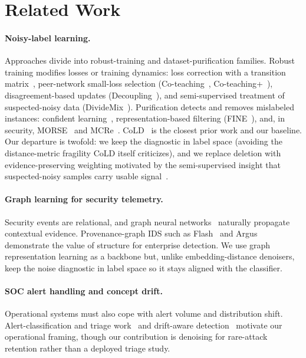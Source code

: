 \documentclass[preprint,3p,times]{elsarticle}
\begin{document}
\section{Related Work}
\label{sec:related}
\paragraph{Noisy-label learning.}
Approaches divide into robust-training and dataset-purification families. Robust
training modifies losses or training dynamics: loss correction with a transition
matrix~\cite{patrini2017making}, peer-network small-loss selection
(Co-teaching~\cite{han2018coteaching}, Co-teaching+~\cite{yu2019coteachingplus}),
disagreement-based updates (Decoupling~\cite{malach2017decoupling}), and
semi-supervised treatment of suspected-noisy data
(DivideMix~\cite{li2020dividemix}). Purification detects and removes mislabeled
instances: confident learning~\cite{northcutt2021confident}, representation-based
filtering (FINE~\cite{kim2021fine}), and, in security, MORSE~\cite{wu2023morse}
and MCRe~\cite{yuan2023mcre}. CoLD~\cite{yang2026cold} is the closest prior work
and our baseline. Our departure is twofold: we keep the diagnostic in label space
(avoiding the distance-metric fragility CoLD itself criticizes), and we replace
deletion with evidence-preserving weighting motivated by the semi-supervised
insight that suspected-noisy samples carry usable signal~\cite{li2020dividemix,wu2023morse}.

\paragraph{Graph learning for security telemetry.}
Security events are relational, and graph neural
networks~\cite{kipf2017gcn,velickovic2018gat,hamilton2017graphsage,hu2020hgt}
naturally propagate contextual evidence. Provenance-graph IDS such as
Flash~\cite{rehman2024flash} and Argus~\cite{xu2024argus} demonstrate the value of
structure for enterprise detection. We use graph representation learning as a
backbone but, unlike embedding-distance denoisers, keep the noise diagnostic in
label space so it stays aligned with the classifier.

\paragraph{SOC alert handling and concept drift.}
Operational systems must also cope with alert volume and distribution shift.
Alert-classification and triage work~\cite{vaarandi2024nids,chavali2024rlalert}
and drift-aware detection~\cite{yang2021cade} motivate our operational framing,
though our contribution is denoising for rare-attack retention rather than a
deployed triage study.
\end{document}
